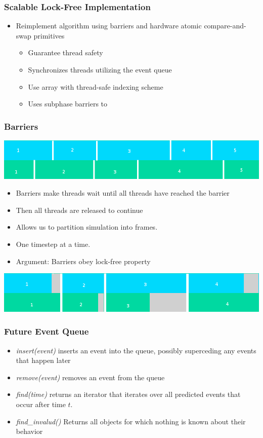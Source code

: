 \documentclass{beamer}
\begin{document}
\begin{frame}
	\frametitle{Scalable Lock-Free Implementation}
	\begin{itemize}
		\item Reimplement algorithm using barriers and hardware atomic compare-and-swap primitives
		\begin{itemize}
			\item Guarantee thread safety
			\item Synchronizes threads utilizing the event queue
			\item Use array with thread-safe indexing scheme
			\item Uses subphase barriers to 
		\end{itemize}
	\end{itemize}
\end{frame}

\begin{frame}[fragile]
	\frametitle{Barriers}
	\includegraphics[width=.9\textwidth]{unsync.png}
	\begin{itemize}
		\item Barriers make threads wait until all threads have reached the barrier
		\item Then all threads are released to continue
		\item Allows us to partition simulation into frames.
		\item One timestep at a time.
		\item Argument: Barriers obey lock-free property
	\end{itemize}
	\includegraphics[width=.9\textwidth]{sync.png}
\end{frame}

\begin{frame}
	\frametitle{Future Event Queue}
	\begin{itemize}
	\item \emph{insert(event)} inserts an event into the queue, possibly superceding any events that happen later
	\item \emph{remove(event)} removes an event from the queue	
	\item \emph{find(time)} returns an iterator that iterates over all predicted events that occur after time $t$.
	\item \emph{find\_invalud()} Returns all objects for which nothing is known about their behavior
	\end{itemize}
\end{frame}
\end{document}
